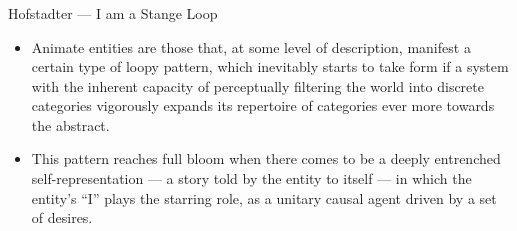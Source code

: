 \documentclass[UTF8,aspectratio=43,11pt,colorlinks,compress,openany]{beamer}%
\begin{document}
\begin{frame}\frametitle{}
\begin{block}{Hofstadter --- I am a Stange Loop}
\begin{itemize}
	\item Animate entities are those that, at some level of description, manifest a certain type of loopy pattern, which inevitably starts to take form if a system with the inherent capacity of perceptually filtering the world into discrete categories vigorously expands its repertoire of categories ever more towards the abstract.
	\item This pattern reaches full bloom when there comes to be a deeply entrenched self-representation --- a story told by the entity to itself --- in which the entity's ``I'' plays the starring role, as a unitary causal agent driven by a set of desires.
\end{itemize}
\end{block}
\begin{figure}[H]
\end{figure}
\end{frame}
\end{document}

